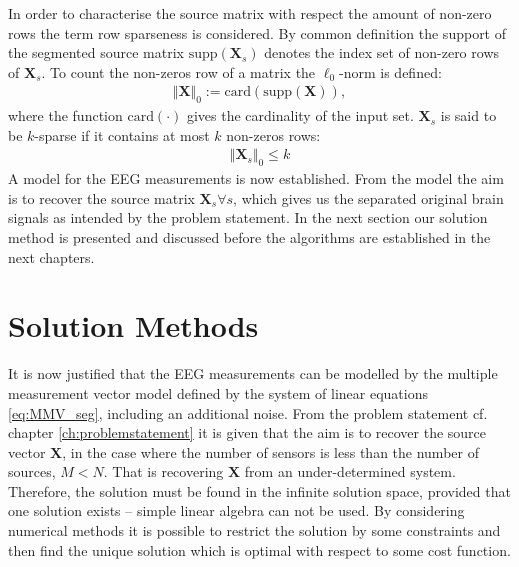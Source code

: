 In order to characterise the source matrix with respect the amount of non-zero rows the term row sparseness is considered.  
By common definition the support of the segmented source matrix $\text{supp}(\mathbf{X}_s)$ denotes the index set of non-zero rows of $\mathbf{X}_s$.
To count the non-zeros row of a matrix the $\ell_0$-norm is defined:
\begin{align*}
\Vert \mathbf{X} \Vert_0 := \text{card}(\text{supp}(\mathbf{X})),
\end{align*}
where the function $\text{card}(\cdot)$ gives the cardinality of the input set. 
$\textbf{X}_s$ is said to be $k$-sparse if it contains at most $k$ non-zeros rows:
\begin{align*}
\Vert \mathbf{X}_s \Vert_0 \leq k
\end{align*}
A model for the EEG measurements is now established.
From the model the aim is to recover the source matrix $\textbf{X}_s \forall s$, which gives us the separated original brain signals as intended by the problem statement.      
In the next section our solution method is presented and discussed before the algorithms are established in the next chapters.    

\section{Solution Methods}\label{sec:sol_met}
It is now justified that the EEG measurements can be modelled by the multiple measurement vector model defined by the system of linear equations \eqref{eq:MMV_seg}, including an additional noise.
From the problem statement cf. chapter \ref{ch:problemstatement} it is given that the aim is to recover the source vector $\textbf{X}$, in the case where the number of sensors is less than the number of sources, $M < N$. That is recovering $\textbf{X}$ from an under-determined system. Therefore, the solution must be found in the infinite solution space, provided that one solution exists -- simple linear algebra can not be used. 
By considering numerical methods it is possible to restrict the solution by some constraints and then find the unique solution which is optimal with respect to some cost function.

